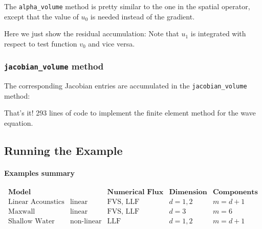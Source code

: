 \documentclass[a4paper,12pt]{article}
\theoremstyle{definition}
\theoremstyle{definition}
\begin{document}
The \lstinline{alpha_volume} method is pretty similar
to the one in the spatial operator, except that the value of $u_0$
is needed instead of the gradient.

Here we just show the residual accumulation:
%
Note that $u_1$ is integrated with respect to test function $v_0$
and vice versa.

\subsubsection*{\lstinline{jacobian_volume} method}

The corresponding Jacobian entries are accumulated in the
\lstinline{jacobian_volume} method:
%

That's it! 293 lines of code to implement the finite element method for
the wave equation.

\subsection{Running the Example}

\paragraph{Examples summary}

$$
\begin{array}{c|c|c|c|c}
\textbf{Model} & &\textbf{Numerical Flux}  & \textbf{Dimension} & \textbf{Components} \\  \hline
\text{Linear Acounstics} & \text{linear}& \text{FVS, LLF} & d = 1,2 & m = d + 1  \\
\text{Maxwall       }    & \text{linear} & \text{FVS, LLF} & d = 3 & m = 6 \\
\text{Shallow Water} & \text{non-linear} &\text{LLF} & d = 1,2 & m = d+1
\end{array}
$$


\end{document}
